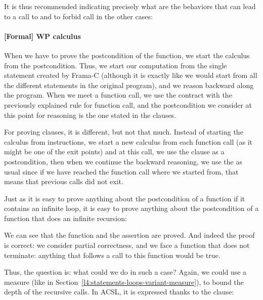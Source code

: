 

It is thus recommended indicating precisely what are the behaviors that can lead
to a call to  and to forbid call  in the other
cases:




\paragraph*{[Formal] WP calculus}


When we have to prove the postcondition of the function, we start the calculus
from the postcondition. Thus, we start our computation from the single
 statement created by Frama-C (although it is exactly like
we would start from all the different  statements in the
original program), and we reason backward along the program. When we meet a
function call, we use the contract with the previously explained rule for
function call, and the postcondition we consider at this point for reasoning is
the one stated in the  clauses.


For proving  clauses, it is different, but not that much.
Instead of starting the calculus from  instructions, we start
a new calculus from each function call (as it might be one of the exit points)
and at this call, we use the  clause as a postcondition, then
when we continue the backward reasoning, we use the  as
usual since if we have reached the function call where we started from, that
means that previous calls did not exit.




Just as it is easy to prove anything about the postcondition of a function if it
contains an infinite loop, it is easy to prove anything about the postcondition
of a function that does an infinite recursion:






We can see that the function and the assertion are proved. And indeed the
proof is correct: we consider partial correctness, and we face a function
that does not terminate: anything that follows a call to this function would
be true.


Thus, the question is: what could we do in such a case? Again, we could use
a measure (like in Section~\ref{l4:statements-loops-variant-measure}), to
bound the depth of the recursive calls. In ACSL, it is expressed thanks to the
 clause:


